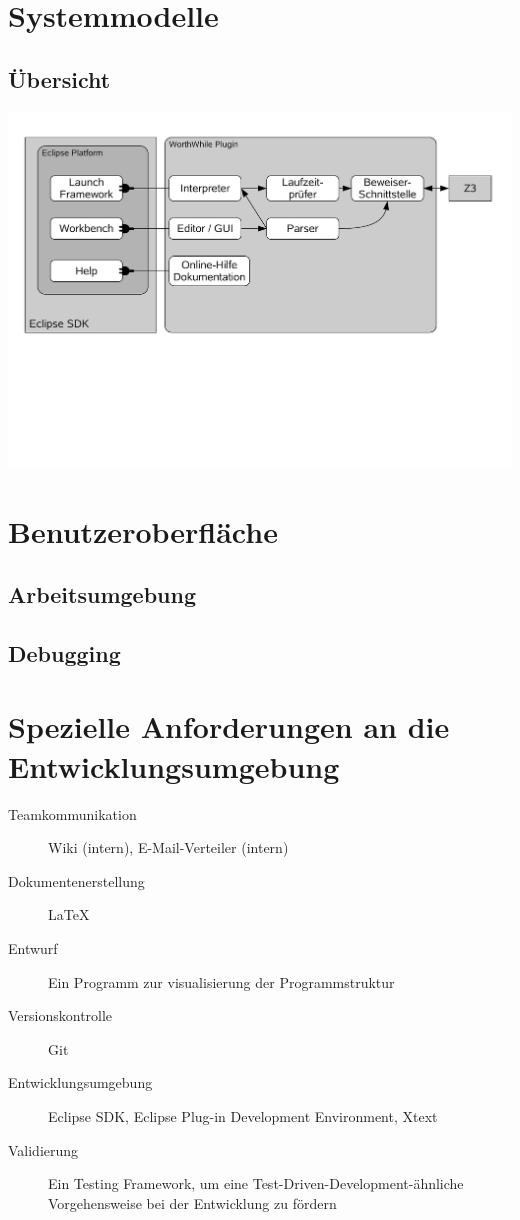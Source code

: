 \section{Systemmodelle}%

\subsection{Übersicht}%

\includegraphics{architektur/architektur.pdf}


\section{Benutzeroberfläche}%

\subsection{Arbeitsumgebung}%

%

\subsection{Debugging}%

%


\section{Spezielle Anforderungen an die Entwicklungsumgebung}%

\begin{description}%
    \item [Teamkommunikation] Wiki (intern), E-Mail-Verteiler (intern)
    \item [Dokumentenerstellung] \see \LaTeX{}%
    \item [Entwurf] Ein Programm zur visualisierung der Programmstruktur
    \item [Versionskontrolle] \see Git%
    \item [Entwicklungsumgebung] \see Eclipse SDK, \see Eclipse Plug-in Development Environment, \see Xtext%
    \item [Validierung] Ein Testing Framework, um eine Test-Driven-Development-ähnliche Vorgehensweise bei der Entwicklung zu fördern
\end{description}%


